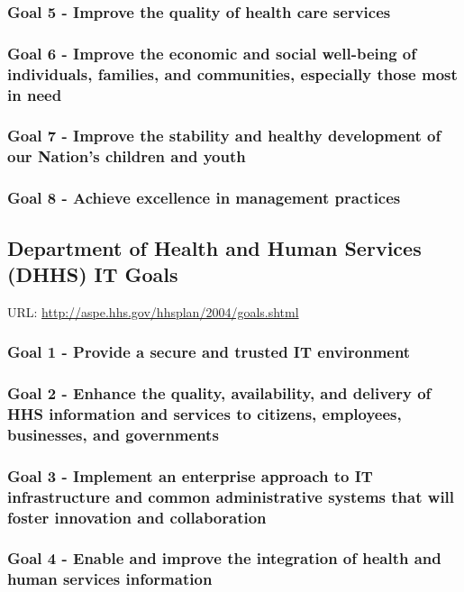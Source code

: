 \documentclass[11pt]{article}
\begin{document}
\subsubsection{Goal 5 - Improve the quality of health care services}
\label{sec:orgfb91205}
\subsubsection{Goal 6 - Improve the economic and social well-being of individuals, families, and communities, especially those most in need}
\label{sec:org6517804}
\subsubsection{Goal 7 - Improve the stability and healthy development of our Nation’s children and youth}
\label{sec:orgb8f3050}
\subsubsection{Goal 8 - Achieve excellence in management practices}
\label{sec:org343cc2b}

\subsection{Department of Health and Human Services (DHHS) IT Goals}
\label{sec:org5d81df3}
URL: \url{http://aspe.hhs.gov/hhsplan/2004/goals.shtml}
\subsubsection{Goal 1 - Provide a secure and trusted IT environment}
\label{sec:orgd88a345}
\subsubsection{Goal 2 - Enhance the quality, availability, and delivery of HHS information and services to citizens, employees, businesses, and governments}
\label{sec:orgd011c18}
\subsubsection{Goal 3 - Implement an enterprise approach to IT infrastructure and common administrative systems that will foster innovation and collaboration}
\label{sec:org90da7cf}
\subsubsection{Goal 4 - Enable and improve the integration of health and human services information}
\label{sec:orgc7959db}
\end{document}
